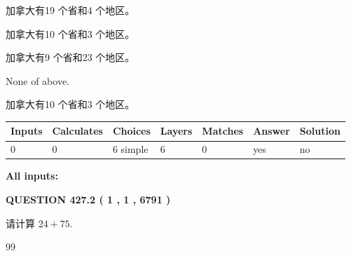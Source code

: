 \documentclass{ctexart}
\begin{document}
 
加拿大有19 个省和4 个地区。
 
 
加拿大有10 个省和3 个地区。
 
 
加拿大有9 个省和23 个地区。
 
 
 None of above.
 
 
\noindent{}
 
 
加拿大有10 个省和3 个地区。
 
 
\noindent{}
 
 
   
   
   
   
\noindent\begin{tabular}{|l|l|l|l|l|l|l|}
 \hline
Inputs & Calculates & Choices & Layers & Matches & Answer & Solution \\ \hline
 0  & 
 0  & 
 6
  simple  
  & 
 6  & 
 0  & 
  yes & 
  no 
  \\ \hline
 \end{tabular}
   
   
   
   
\noindent{}
   
   
   
   
\noindent\vspace{0.1in}\hspace{-0.08in} {\textbf{\Large{All inputs: }}}
   
   
  
\vspace{0.2in}
  
{\textbf{\Large{QUESTION
427.2 
 ( 1 , 1 , 6791 )
}}}
  
  
 
请计算 $ %
24 +  %
75 $.
 
 
 
\noindent{}
 
 

99
 
 
\noindent{}
 
 
\end{document}

